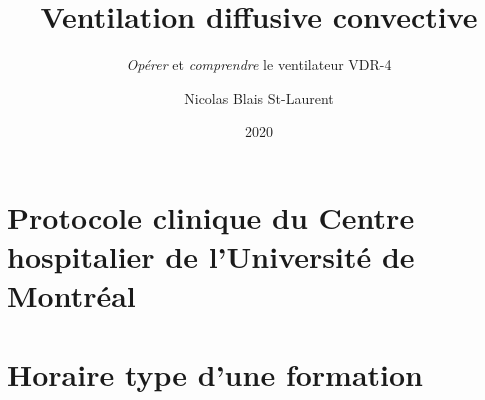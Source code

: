 \documentclass[letterpaper, final]{book}
\title{Ventilation diffusive convective}
\subtitle{\emph{Opérer} et \emph{comprendre} le ventilateur VDR-4}
\author{Nicolas Blais St-Laurent}
\date{2020}
\begin{document}
\frontmatter
\maketitle

\cleardoublepage
\tableofcontents
\clearpage
\listoffigures


\mainmatter






\begin{appendices}


\chapter{Protocole clinique du Centre hospitalier de l'Université de Montréal}
%

\titleformat{\chapter}[display]{\normalfont\huge\bfseries}{\chaptertitlename\ \thechapter}{20pt}{\Huge}   
\titlespacing*{\chapter}{0pt}{-50pt}{40pt}

\chapter{Horaire type d'une formation}


\end{appendices}
\restoregeometry

\backmatter

\printbibliography
\printindex
\end{document}
